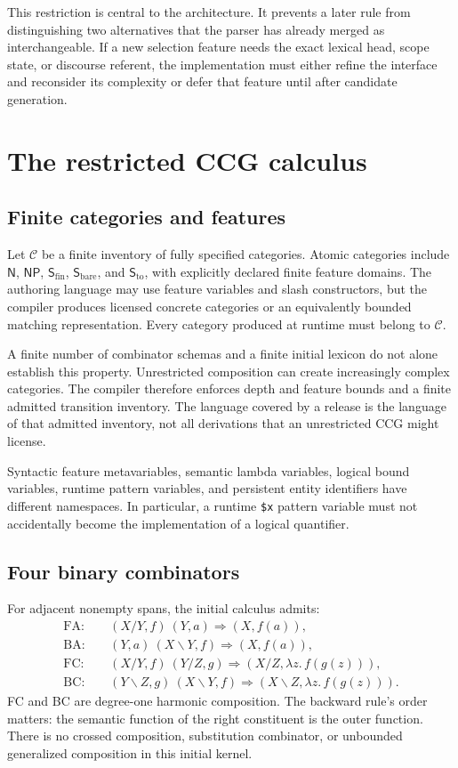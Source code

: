 \documentclass[11pt,a4paper]{article}
\newcommand{\NP}{\mathsf{NP}}
\newcommand{\NC}{\mathsf{N}}
\newcommand{\SF}{\mathsf{S}_{\mathrm{fin}}}
\newcommand{\SB}{\mathsf{S}_{\mathrm{bare}}}
\newcommand{\ST}{\mathsf{S}_{\mathrm{to}}}
\newcommand{\code}[1]{\texttt{#1}}
\begin{document}
This restriction is central to the architecture. It prevents a later rule
from distinguishing two alternatives that the parser has already merged as
interchangeable. If a new selection feature needs the exact lexical head,
scope state, or discourse referent, the implementation must either refine the
interface and reconsider its complexity or defer that feature until after
candidate generation.

\section{The restricted CCG calculus}\label{sec:calculus}

\subsection{Finite categories and features}
Let \(\mathcal C\) be a finite inventory of fully specified categories. Atomic
categories include \(\NC\), \(\NP\), \(\SF\), \(\SB\), and \(\ST\), with
explicitly declared finite feature domains. The authoring language may use
feature variables and slash constructors, but the compiler produces licensed
concrete categories or an equivalently bounded matching representation.
Every category produced at runtime must belong to \(\mathcal C\).

A finite number of combinator schemas and a finite initial lexicon do not
alone establish this property. Unrestricted composition can create
increasingly complex categories. The compiler therefore enforces depth and
feature bounds and a finite admitted transition inventory. The language
covered by a release is the language of that admitted inventory, not all
derivations that an unrestricted CCG might license.

Syntactic feature metavariables, semantic lambda variables, logical bound
variables, runtime pattern variables, and persistent entity identifiers have
different namespaces. In particular, a runtime \code{\$x} pattern variable
must not accidentally become the implementation of a logical quantifier.

\subsection{Four binary combinators}
For adjacent nonempty spans, the initial calculus admits:
\begin{align}
 \mathrm{FA}:&\quad (X/Y,f)\ (Y,a)
       \Longrightarrow (X,f(a)), \label{eq:fa}\\
 \mathrm{BA}:&\quad (Y,a)\ (X\backslash Y,f)
       \Longrightarrow (X,f(a)),\\
 \mathrm{FC}:&\quad (X/Y,f)\ (Y/Z,g)
       \Longrightarrow (X/Z,\lambda z.\,f(g(z))),\\
 \mathrm{BC}:&\quad (Y\backslash Z,g)\ (X\backslash Y,f)
       \Longrightarrow (X\backslash Z,\lambda z.\,f(g(z))).
       \label{eq:bc}
\end{align}
FC and BC are degree-one harmonic composition. The backward rule's order
matters: the semantic function of the right constituent is the outer function.
There is no crossed composition, substitution combinator, or unbounded
generalized composition in this initial kernel.
\end{document}
